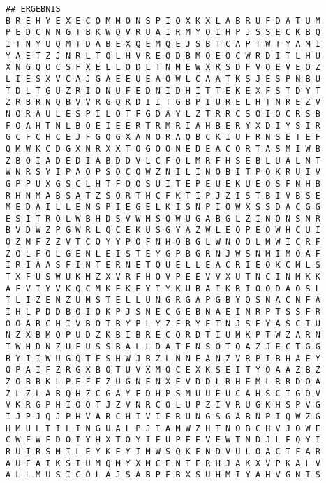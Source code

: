 \documentclass[a4paper,10pt,ngerman]{scrartcl}
\begin{document}
\begin{lstlisting}
## ERGEBNIS
B R E H Y E X E C O M M O N S P I O X K X L A B R U F D A T U M
P E D C N N G T B K W Q V R U A I R M Y O I H P J S S E C K B Q
I T N Y U Q M T D A B E X Q E M Q E J S B T C A P T W T Y A M I
Y A E T Z J N R L T Q L H V R E O D B M O E O C W R D I T L H U
X N G Q O C S F X E L L O D L T N M E W X R S D F V O E V E O Z
L I E S X V C A J G A E E U E A O W L C A A T K S J E S P N B U
T D L T G U Z R I O N U F E D N I D H I T T E K E X F S T D Y T
Z R B R N Q B V V R G Q R D I I T G B P I U R E L H T N R E Z V
N O R A U L E S P I L O T F G D A Y L Z T R R C S O I O C R S B
F O A H T N L B O E I E E R T R M R I A H B E R Y X D I Y S I R
G C F C H C E J F G Q G X A N O R A Q B C K I U F R N S E T E F
Q M W K C D G X N R X X T O G O O N E D E A C O R T A S M I W B
Z B O I A D E D I A B D D V L C F O L M R F H S E B L U A L N T
W N R S Y I P A O P S Q C Q W Z N I L I N O B I T P O K R U I V
G P P U X G S C L H T F O O S U I T E P E U E K U E O S F N H B
R H N M A B S A T Z S O R T H C F K T I P J Z I S T B I V B S E
M E D A I L L E N S P I E G E L K I S N P I O W X S S D A C G G
E S I T R Q L W B H D S V W M S Q W U G A B G L Z I N O N S N R
B V D W Z P G W R L Q C E K U S G Y A Z W L E Q P E O W H C U I
O Z M F Z Z V T C Q Y Y P O F N H Q B G L W N Q O L M W I C R F
Z O L F O L G E N L E I S T E Y G P B G R N J W S N M I M O A F
I R I A A S F I N T E R N E T Q U E L L E A C R I E O K C M L S
T X F U S W U K M Z X V R F H O V P E E V V X U T N C I N M K K
A F V I Y V K Q C M K E K E Y I Y K U B A I K R I O O D A O S L
T L I Z E N Z U M S T E L L U N G R G A P G B Y O S N A C N F A
I H L P D D B O I O K P J S N E C G E B N A E I N R P T S S F R
O O A R C H I V B O T B Y P L Y Z F R Y E T N J S E Y A S C I U
N Z X B M O P U D Z K B I B R E C O R D T I U M K P T W Z A R N
T W H D N Z U F U S S B A L L D A T E N S O T Q A Z J E C T G G
B Y I I W U G Q T F S H W J B Z L N N E A N Z V R P I B H A E Y
O P A I F Z R G X B O T U V X M O C E X K S E I T Y O A A Z B Z
Z O B B K L P E F F Z U G N E N X E V D D L R H E M L R R D O A
Z L Z L A B Q H Z C G A Y F D H P S M U U E U C A H S C T G D V
V K R G P H I O O T J Z V N R C O L U P Z I V R U G K H S P V G
I J P J Q J P H V A R C H I V I E R U N G S G A B N P I Q W Z G
H M U L T I L I N G U A L P J I A M W Z H T N O B C H V J O W E
C W F W F D O I Y H X T O Y I F U P F E V E W T N D J L F Q Y I
R U I R S M I L E Y K E Y I M W S Q K F N D V U L O A C T F A R
A U F A I K S I U M Q M Y X M C E N T E R H J A K X V P K A L V
A L L M U S I C O L A J S A B P F B X S U H M I Y A H V G N I S

\end{lstlisting}
\end{document}
